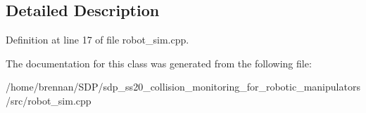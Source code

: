\subsection{Detailed Description}


Definition at line 17 of file robot\+\_\+sim.\+cpp.



The documentation for this class was generated from the following file\+:\begin{DoxyCompactItemize}
\item 
/home/brennan/\+S\+D\+P/sdp\+\_\+ss20\+\_\+collision\+\_\+monitoring\+\_\+for\+\_\+robotic\+\_\+manipulators/src/robot\+\_\+sim.\+cpp\end{DoxyCompactItemize}

